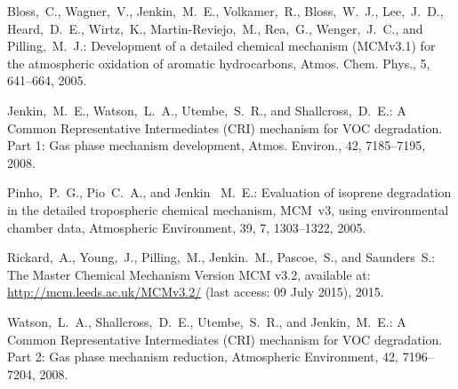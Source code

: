 \documentclass{article}
\begin{document}
\begin{thebibliography}{3}

     Bloss,~C., Wagner,~V., Jenkin,~M.~E., Volkamer,~R., Bloss,~W.~J., Lee,~J.~D., Heard,~D.~E., Wirtz,~K., Martin-Reviejo,~M., Rea,~G., Wenger,~J.~C., and Pilling,~M.~J.: Development of a detailed chemical mechanism (MCMv3.1) for the atmospheric oxidation of aromatic hydrocarbons, Atmos. Chem. Phys., 5, 641--664, 2005.

 Jenkin,~M.~E., Watson,~L.~A., Utembe,~S.~R., and Shallcross,~D.~E.: {A Common Representative Intermediates (CRI) mechanism for VOC degradation. Part 1: Gas phase mechanism development}, Atmos. Environ., 42, 7185--7195, 2008.

     Pinho,~P.~G., Pio~C.~A., and Jenkin~ M.~E.: Evaluation of isoprene degradation in the detailed tropospheric chemical mechanism, MCM~v3, using environmental chamber data, Atmospheric Environment, 39, 7, 1303--1322, 2005.

     Rickard,~A., Young,~J., Pilling,~M., Jenkin.~M., Pascoe,~S., and Saunders~S.: {The Master Chemical Mechanism Version MCM v3.2}, available at: \url{http://mcm.leeds.ac.uk/MCMv3.2/} (last access: 09 July 2015), 2015.

     Watson,~L.~A., Shallcross,~D.~E., Utembe,~S.~R., and Jenkin,~M.~E.: A Common Representative Intermediates (CRI) mechanism for VOC degradation. Part 2: Gas phase mechanism reduction, Atmospheric Environment, 42, 7196--7204, 2008.

\end{thebibliography}
\end{document}

